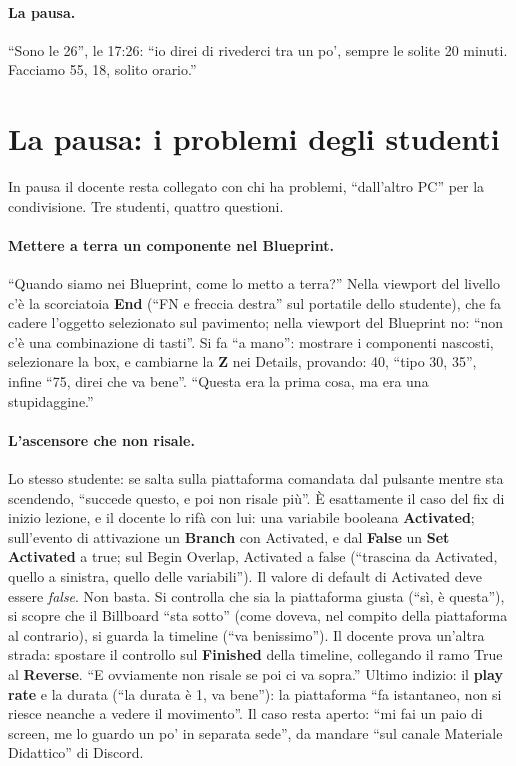 \paragraph{La pausa.} ``Sono le 26'', le 17:26: ``io direi di rivederci tra un po', sempre
le solite 20 minuti. Facciamo 55, 18, solito orario.''

\section{La pausa: i problemi degli studenti}
\label{ue8:sec:pausa}

In pausa il docente resta collegato con chi ha problemi, ``dall'altro PC'' per la
condivisione. Tre studenti, quattro questioni.

\paragraph{Mettere a terra un componente nel Blueprint.} ``Quando siamo nei Blueprint,
come lo metto a terra?'' Nella viewport del livello c'è la scorciatoia
\textbf{End} (``FN e freccia destra'' sul portatile dello studente), che fa cadere
l'oggetto selezionato sul pavimento; nella viewport del Blueprint no: ``non c'è una
combinazione di tasti''. Si fa ``a mano'': mostrare i componenti nascosti, selezionare
la box, e cambiarne la \textbf{Z} nei Details, provando: 40, ``tipo 30, 35'', infine
``75, direi che va bene''. ``Questa era la prima cosa, ma era una stupidaggine.''

\paragraph{L'ascensore che non risale.} Lo stesso studente: se salta sulla piattaforma
comandata dal pulsante mentre sta scendendo, ``succede questo, e poi non risale più''. È
esattamente il caso del fix di inizio lezione, e il docente lo rifà con lui: una
variabile booleana \textbf{Activated}; sull'evento di attivazione un \textbf{Branch} con
Activated, e dal \textbf{False} un \textbf{Set Activated} a true; sul Begin Overlap,
Activated a false (``trascina da Activated, quello a sinistra, quello delle variabili'').
Il valore di default di Activated deve essere \emph{false}. Non basta. Si controlla che
sia la piattaforma giusta (``sì, è questa''), si scopre che il Billboard ``sta sotto''
(come doveva, nel compito della piattaforma al contrario), si guarda la timeline (``va
benissimo''). Il docente prova un'altra strada: spostare il controllo sul
\textbf{Finished} della timeline, collegando il ramo True al \textbf{Reverse}. ``E
ovviamente non risale se poi ci va sopra.'' Ultimo indizio: il \textbf{play rate} e la
durata (``la durata è 1, va bene''): la piattaforma ``fa istantaneo, non si riesce
neanche a vedere il movimento''. Il caso resta aperto: ``mi fai un paio di screen, me lo
guardo un po' in separata sede'', da mandare ``sul canale Materiale Didattico'' di
Discord.

